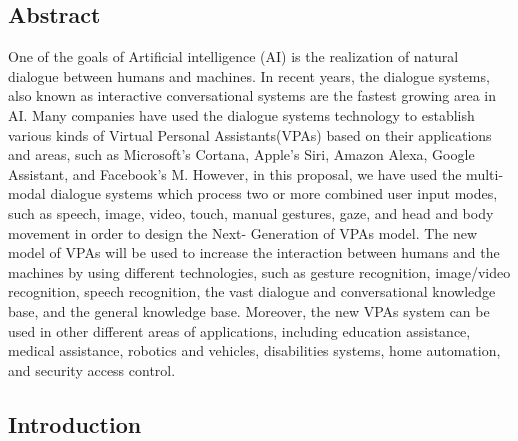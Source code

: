 \documentclass[12pt,a4paper]{article}
\begin{document}
\newpage
\cleardoublepage
\thispagestyle{empty}
\begin{center}
\section{Abstract}
\end{center}
\noindent
One of the goals of Artificial intelligence (AI) is the
realization of natural dialogue between humans and machines. In recent years, the dialogue systems, also known as interactive conversational systems are the fastest growing area in AI. Many companies have used the dialogue systems technology to establish various kinds of Virtual Personal Assistants(VPAs) based on their applications and areas, such as Microsoft’s Cortana, Apple’s Siri, Amazon Alexa, Google Assistant, and Facebook’s M. However, in this proposal, we have used the multi-modal dialogue systems which process two or more combined user input modes, such as speech, image, video, touch, manual gestures, gaze, and head and body movement in order to design the Next-
Generation of VPAs model. The new model of VPAs will be used
to increase the interaction between humans and the machines by
using different technologies, such as gesture recognition,
image/video recognition, speech recognition, the vast dialogue
and conversational knowledge base, and the general knowledge
base. Moreover, the new VPAs system can be used in other
different areas of applications, including education assistance,
medical assistance, robotics and vehicles, disabilities systems,
home automation, and security access control.
\newpage
\tableofcontents
\newpage
\begin{center}
\section{Introduction}
\end{center}
\end{document}

